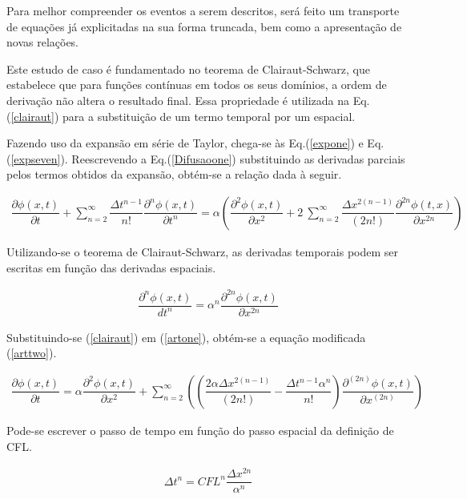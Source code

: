 	Para melhor compreender os eventos a serem descritos, será feito um transporte de equações já explicitadas na sua forma truncada, bem como a apresentação de novas relações.
	
	Este estudo de caso é fundamentado no teorema de Clairaut-Schwarz, que estabelece que para funções contínuas em todos os seus domínios, a ordem de derivação não altera o resultado final. Essa propriedade é utilizada na Eq.(\ref{clairaut}) para a substituição de um termo temporal por um espacial.
	
	Fazendo uso da expansão em série de Taylor, chega-se às Eq.(\ref{expone}) e Eq.(\ref{expseven}). Reescrevendo a Eq.(\ref{Difusaoone}) substituindo as derivadas parciais pelos termos obtidos da expansão, obtém-se a relação dada à seguir.
	
\begin{align}
\label{artone}
\dfrac{\partial \phi (x,t)}{\partial t} + \sum_{n=2}^{\infty} \dfrac{\Delta t ^{n-1}}{n!} \dfrac{\partial^{n}\phi(x,t)}{\partial t^{n}} = \alpha \left( \dfrac{\partial^{2}\phi(x,t)}{\partial x^{2}} + 2 \ \sum_{n=2}^{\infty} \dfrac{\Delta x^{2(n-1)}}{(2n!)} \dfrac{\partial^{2n}\phi(t,x)}{\partial x^{2n}}\right)
\end{align}

	
	Utilizando-se o teorema de Clairaut-Schwarz, as derivadas temporais podem ser escritas em função das derivadas espaciais.
	
\begin{align}
\label{clairaut}
\dfrac{\partial^{n}\phi(x,t)}{dt^{n}} = \alpha^{n} \dfrac{\partial^{2n}\phi(x,t)}{\partial x^{2n}}
\end{align}

	Substituindo-se (\ref{clairaut}) em (\ref{artone}), obtém-se a equação modificada (\ref{arttwo}).
	
\begin{align}
\label{arttwo}
\dfrac{\partial \phi (x,t)}{\partial t} = \alpha  \dfrac{\partial^{2}\phi(x,t)}{\partial x^{2}} + \sum_{n=2}^{\infty}\left(\left(\dfrac{2\alpha\Delta x^{2(n-1)}}{(2n!)}-\dfrac{\Delta t^{n-1}\alpha^{n}}{n!}\right) \dfrac{\partial^{(2n)}\phi(x,t)}{\partial x^{(2n)}}\right)
\end{align}

	Pode-se escrever o passo de tempo em função do passo espacial da definição de CFL.
	
\begin{align}
\label{artthree}
\Delta t^{n}=CFL^{n}\dfrac{\Delta x^{2n}}{\alpha^{n}}
\end{align}

